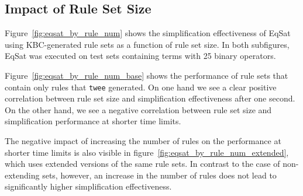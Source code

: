 \FloatBarrier
\subsection{Impact of Rule Set Size}
\label{sec:impact_set_size}
Figure~\ref{fig:eqsat_by_rule_num} shows the simplification effectiveness of EqSat using KBC-generated rule sets as a function of rule set size. In both subfigures, EqSat was executed on test sets containing terms with 25 binary operators.

Figure~\ref{fig:eqsat_by_rule_num_base} shows the performance of rule sets that contain only rules that \texttt{twee} generated. On one hand we see a clear positive correlation between rule set size and simplification effectiveness after one second. On the other hand, we see a negative correlation between rule set size and simplification performance at shorter time limits. 

The negative impact of increasing the number of rules on the performance at shorter time limits is also visible in figure~\ref{fig:eqsat_by_rule_num_extended}, which uses extended versions of the same rule sets. In contrast to the case of non-extending sets, however, an increase in the number of rules does not lead to significantly higher simplification effectiveness.

